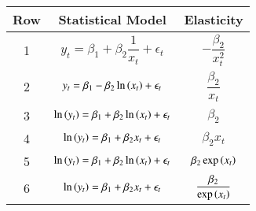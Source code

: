 \begin{tabular}{|c|c|c|}
\hline
Row & Statistical Model & Elasticity \\
\hline
1 & $y_t = \beta_1 + \beta_2 \dfrac{1}{x_t} + \epsilon_t$ & $-\dfrac{\beta_2}{x_t^2}$ \\
2 & $y_t = \beta_1 - \beta_2 \ln \left(x_t\right) + \epsilon_t$ & $\dfrac{\beta_2}{x_t}$ \\
3 & $\ln \left(y_t\right) = \beta_1 + \beta_2 \ln \left(x_t\right) + \epsilon_t $ & $\beta_2$ \\
4 & $\ln \left(y_t\right) = \beta_1 + \beta_2 x_t + \epsilon_t$ & $\beta_2 x_t$ \\
5 & $\ln \left(y_t\right) = \beta_1 + \beta_2 \ln \left(x_t\right) + \epsilon_t $ & $\beta_2 \exp \left(x_t\right)$ \\
6 & $\ln \left(y_t\right) = \beta_1 + \beta_2 x_t + \epsilon_t$ & $\dfrac{\beta_2}{\exp \left(x_t\right)}$ \\
\hline
\end{tabular}
